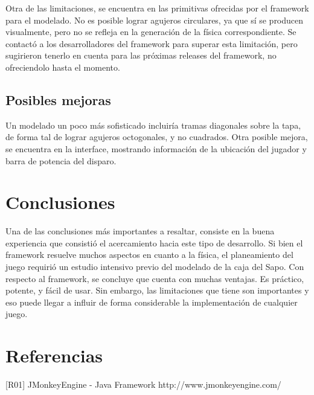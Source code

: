 \documentclass{acm_proc_article-sp}
\begin{document}
Otra de las limitaciones, se encuentra en las primitivas ofrecidas por el framework para el modelado. No es posible lograr agujeros circulares, ya que s\'i se producen visualmente, pero no se refleja en la generaci\'on de la f\'isica correspondiente. Se contact\'o a los desarrolladores del framework para superar esta limitaci\'on, pero sugirieron tenerlo en cuenta para las pr\'oximas releases del framework, no ofreciendolo hasta el momento.

\subsection{Posibles mejoras}

Un modelado un poco m\'as sofisticado incluir\'ia tramas diagonales sobre la tapa, de forma tal de lograr agujeros octogonales, y no cuadrados. 
Otra posible mejora, se encuentra en la interface, mostrando informaci\'on de la ubicaci\'on del jugador y barra de potencia del disparo.

\section{Conclusiones}
Una de las conclusiones m\'as importantes a resaltar, consiste en la buena experiencia que consisti\'o el acercamiento hacia este tipo de desarrollo. Si bien el framework resuelve muchos aspectos en cuanto a la f\'isica, el planeamiento del juego requiri\'o un estudio intensivo previo del modelado de la caja del Sapo. 
Con respecto al framework, se concluye que cuenta con muchas ventajas. Es pr\'actico, potente, y f\'acil de usar. Sin embargo, las limitaciones que tiene son importantes y eso puede llegar a influir de forma considerable la implementaci\'on de cualquier juego. 



\section*{Referencias}

[R01] JMonkeyEngine - Java Framework http://www.jmonkeyengine.com/


\end{document}

